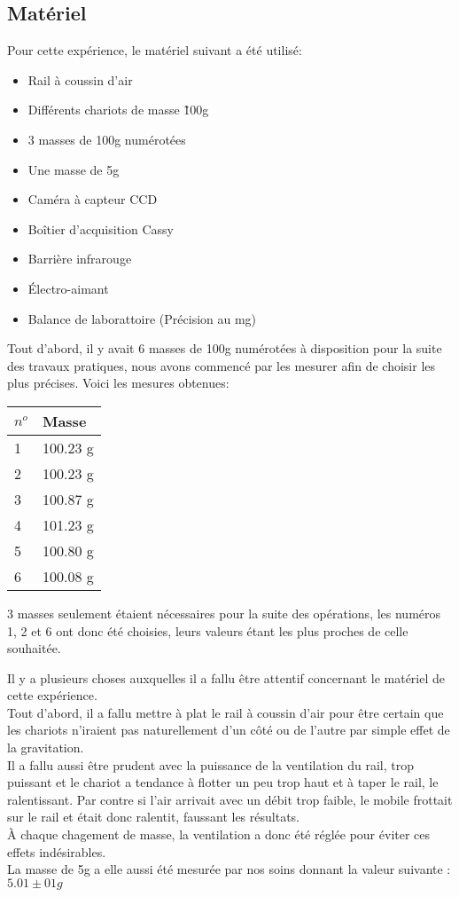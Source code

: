 \subsection{Matériel}
Pour cette expérience, le matériel suivant a été utilisé:
\begin{itemize}
    \item Rail à coussin d'air
    \item Différents chariots de masse \~100g
    \item 3 masses de 100g numérotées
    \item Une masse de 5g
    \item Caméra à capteur CCD
    \item Boîtier d'acquisition Cassy
    \item Barrière infrarouge
    \item Électro-aimant
    \item Balance de laborattoire (Précision au mg)
\end{itemize}


Tout d'abord, il y avait 6 masses de 100g numérotées à disposition pour la suite des travaux pratiques, nous avons commencé par les mesurer afin de choisir les plus précises. Voici les mesures obtenues:
\begin{table}[h]
\centering
\begin{tabular}{|l|l|}
\hline
$n^o$ & Masse \\
\hline
1 & 100.23 g \\
2 & 100.23 g \\
3 & 100.87 g \\
4 & 101.23 g \\
5 & 100.80 g \\
6 & 100.08 g \\
\hline
\end{tabular}
\end{table}
3 masses seulement étaient nécessaires pour la suite des opérations, les numéros 1, 2 et 6 ont donc été choisies, leurs valeurs étant les plus proches de celle souhaitée.

Il y a plusieurs choses auxquelles il a fallu être attentif concernant le matériel de cette expérience.\\
Tout d'abord, il a fallu mettre à plat le rail à coussin d'air pour être certain que les chariots n'iraient pas naturellement d'un côté ou de l'autre par simple effet de la gravitation.\\
Il a fallu aussi être prudent avec la puissance de la ventilation du rail, trop puissant et le chariot a tendance à flotter un peu trop haut et à taper le rail, le ralentissant. Par contre si l'air arrivait avec un débit trop faible, le mobile frottait sur le rail et était donc ralentit, faussant les résultats.\\
À chaque chagement de masse, la ventilation a donc été réglée pour éviter ces effets indésirables.\\
La masse de 5g a elle aussi été mesurée par nos soins donnant la valeur suivante : $5.01 \pm 01g$

